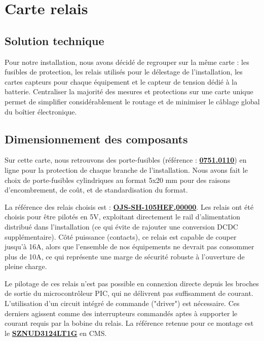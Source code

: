     \section{Carte relais}
        \subsection{Solution technique}
            Pour notre installation, nous avons décidé de regrouper sur la même carte : les fusibles de protection, les relais utilisés pour le délestage de l'installation, les cartes capteurs pour chaque équipement et le capteur de tension dédié à la batterie. Centraliser la majorité des mesures et protections sur une carte unique permet de simplifier considérablement le routage et de minimiser le câblage global du boîtier électronique.

        \subsection{Dimensionnement des composants}
            Sur cette carte, nous retrouvons des porte-fusibles (référence : \href{https://fr.farnell.com/schurter/0751-0110/fuse-clip-5x20mm-pcb-mount/dp/1453528}{\textbf{0751.0110}}) en ligne pour la protection de chaque branche de l'installation. Nous avons fait le choix de porte-fusibles cylindriques au format 5x20 mm pour des raisons d'encombrement, de coût, et de standardisation du format.

            La référence des relais choisis est : \href{https://fr.farnell.com/te-connectivity-potter-brumfield/ojs-sh-105hef-00000/power-relay-spst-no-5vdc-16a-tht/dp/3776345}{\textbf{OJS-SH-105HEF,00000}}. Les relais ont été choisis pour être pilotés en 5V, exploitant directement le rail d'alimentation distribué dans l'installation (ce qui évite de rajouter une conversion DCDC supplémentaire). Côté puissance (contacts), ce relais est capable de couper jusqu'à 16A, alors que l'ensemble de nos équipements ne devrait pas consommer plus de 10A, ce qui représente une marge de sécurité robuste à l'ouverture de pleine charge.

            Le pilotage de ces relais n'est pas possible en connexion directe depuis les broches de sortie du microcontrôleur PIC, qui ne délivrent pas suffisamment de courant. L'utilisation d'un circuit intégré de commande ("driver") est nécessaire. Ces derniers agissent comme des interrupteurs commandés aptes à supporter le courant requis par la bobine du relais. La référence retenue pour ce montage est le  \href{https://fr.farnell.com/on-semiconductor/sznud3124lt1g/driver-charge-inductive-aec-q101/dp/2774634}{\textbf{SZNUD3124LT1G}} en CMS.

